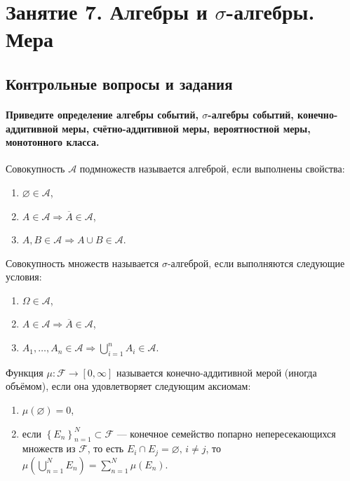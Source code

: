 \chapter*{Занятие 7. Алгебры и $ \sigma $-алгебры. Мера}

\section*{Контрольные вопросы и задания}

\subsubsection*{Приведите определение алгебры событий,
$ \sigma $-алгебры событий, конечно-аддитивной меры, счётно-аддитивной меры, вероятностной меры, монотонного класса.}

Совокупность $\mathcal{A}$ подмножеств называется алгеброй, если выполнены свойства:
\begin{enumerate}
\item $ \varnothing \in \mathcal{A}$,
\item $A \in \mathcal{A} \Rightarrow \overline{A} \in \mathcal{A}$,
\item $A, B \in \mathcal{A} \Rightarrow A \cup B \in \mathcal{A}$.
\end{enumerate}

Совокупность множеств называется $ \sigma $-алгеброй, если выполняются следующие условия:
\begin{enumerate}
\item $ \Omega \in \mathcal{A}$,
\item $A \in \mathcal{A} \Rightarrow \overline{A} \in \mathcal{A}$,
\item $A_1, \dotsc, A_n \in \mathcal{A} \Rightarrow \bigcup \limits_{i=1}^n A_i \in \mathcal{A}$.
\end{enumerate}

Функция $ \mu: \mathcal{F} \rightarrow \left[ 0, \infty \right] $ называется конечно-аддитивной мерой (иногда объёмом), если она удовлетворяет следующим аксиомам:
\begin{enumerate}
\item $ \mu \left( \varnothing \right) = 0$,
\item если
$ \left\{ E_n \right\}_{n=1}^N \subset \mathcal{F}$
--- конечное семейство попарно непересекающихся множеств из
$ \mathcal{F}$, то есть $E_i \cap E_j = \varnothing, \, i \neq j$,
то $ \mu \left( \bigcup \limits_{n=1}^N E_n \right) = \sum \limits_{n=1}^N \mu \left( E_n \right)$.
\end{enumerate}

